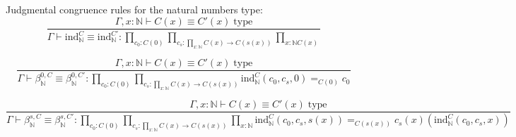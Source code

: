 \documentclass{book}
\begin{document}
Judgmental congruence rules for the natural numbers type:
$$\frac{\Gamma, x:\mathbb{N} \vdash C(x) \equiv C'(x) \; \mathrm{type}}{\Gamma \vdash \mathrm{ind}_\mathbb{N}^C \equiv \mathrm{ind}_\mathbb{N}^{C'}:\prod_{c_0:C(0)} \prod_{c_s:\prod_{x:\mathbb{N}} C(x) \to C(s(x))} \prod_{x:\mathbb{N} C(x)}}$$

$$\frac{\Gamma, x:\mathbb{N} \vdash C(x) \equiv C'(x) \; \mathrm{type}}{\Gamma \vdash \beta_\mathbb{N}^{0, C} \equiv \beta_\mathbb{N}^{0, C'}:\prod_{c_0:C(0)} \prod_{c_s:\prod_{x:\mathbb{N}} C(x) \to C(s(x))} \mathrm{ind}_\mathbb{N}^C(c_0, c_s, 0) =_{C(0)} c_0}$$

$$\frac{\Gamma, x:\mathbb{N} \vdash C(x) \equiv C'(x) \; \mathrm{type}}{\Gamma \vdash \beta_\mathbb{N}^{s, C} \equiv \beta_\mathbb{N}^{s, C'}:\prod_{c_0:C(0)} \prod_{c_s:\prod_{x:\mathbb{N}} C(x) \to C(s(x))} \prod_{x:\mathbb{N}} \mathrm{ind}_\mathbb{N}^C(c_0, c_s, s(x)) =_{C(s(x))} c_s(x)(\mathrm{ind}_\mathbb{N}^C(c_0, c_s, x))}$$
\end{document}
